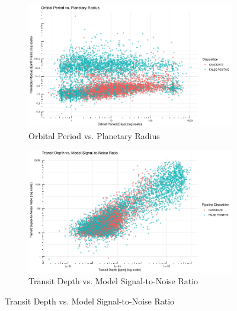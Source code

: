 \begin{figure}[H]
    \centering
    \begin{subfigure}[b]{0.45\textwidth}
        \includegraphics[width=\textwidth]{Immagini/orbital_radius.png}
        \caption{Orbital Period vs. Planetary Radius}
    \end{subfigure}
    \begin{subfigure}[b]{0.45\textwidth}
        \includegraphics[width=\textwidth]{Immagini/transit_depth.png}
        \caption{Transit Depth vs. Model Signal-to-Noise Ratio}
    \end{subfigure}

    \vspace{0.5cm}
    

\end{figure}

